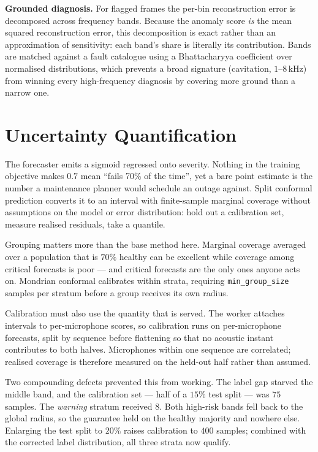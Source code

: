\documentclass[11pt]{article}
\let\oldsection\section
\renewcommand{\section}{\clearpage\oldsection}
\begin{document}
\textbf{Grounded diagnosis.} For flagged frames the per-bin reconstruction error
is decomposed across frequency bands. Because the anomaly score \emph{is} the
mean squared reconstruction error, this decomposition is exact rather than an
approximation of sensitivity: each band's share is literally its contribution.
Bands are matched against a fault catalogue using a Bhattacharyya coefficient
over normalised distributions, which prevents a broad signature (cavitation,
$1$--$8$\,kHz) from winning every high-frequency diagnosis by covering more
ground than a narrow one.

\section{Uncertainty Quantification}
\label{sec:conformal}

The forecaster emits a sigmoid regressed onto severity. Nothing in the training
objective makes $0.7$ mean ``fails 70\% of the time'', yet a bare point estimate
is the number a maintenance planner would schedule an outage against. Split conformal prediction converts it to an
interval with finite-sample marginal coverage without assumptions on the model
or error distribution: hold out a calibration set, measure realised residuals,
take a quantile.

Grouping matters more than the base method here. Marginal coverage averaged over
a population that is $70\%$ healthy can be excellent while coverage among
critical forecasts is poor --- and critical forecasts are the only ones anyone
acts on. Mondrian conformal calibrates within strata, requiring
\texttt{min\_group\_size} samples per stratum before a group receives its own
radius.

Calibration must also use the quantity that is served. The worker attaches
intervals to per-microphone scores, so calibration runs on per-microphone
forecasts, split by sequence before flattening so that no acoustic instant
contributes to both halves. Microphones within one sequence are correlated;
realised coverage is therefore measured on the held-out half rather than
assumed.

Two compounding defects prevented this from working. The label gap starved the
middle band, and the calibration set --- half of a $15\%$ test split --- was
$75$ samples. The \emph{warning} stratum received $8$. Both high-risk bands fell
back to the global radius, so the guarantee held on the healthy majority and
nowhere else. Enlarging the test split to $20\%$ raises calibration to $400$
samples; combined with the corrected label distribution, all three strata now
qualify.
\end{document}
